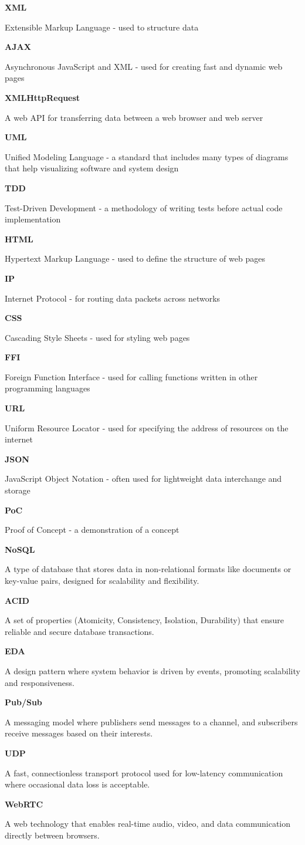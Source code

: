 \documentclass[]{final}
\begin{document}
\textbf{XML}

Extensible Markup Language - used to structure data

\textbf{AJAX}

Asynchronous JavaScript and XML - used for creating fast and dynamic web pages

\textbf{XMLHttpRequest}

A web API for transferring data between a web browser and web server

\textbf{UML}

Unified Modeling Language - a standard that includes many types of diagrams that help visualizing software and system design

\textbf{TDD}

Test-Driven Development - a methodology of writing tests before actual code implementation

\textbf{HTML}

Hypertext Markup Language - used to define the structure of web pages

\textbf{IP}

Internet Protocol - for routing data packets across networks

\textbf{CSS}

Cascading Style Sheets - used for styling web pages

\textbf{FFI}

Foreign Function Interface - used for calling functions written in other programming languages

\textbf{URL}

Uniform Resource Locator - used for specifying the address of resources on the internet

\textbf{JSON}

JavaScript Object Notation - often used for lightweight data interchange and storage

\textbf{PoC}

Proof of Concept - a demonstration of a concept

\textbf{NoSQL}

A type of database that stores data in non-relational formats like documents or key-value pairs, designed for scalability and flexibility.

\textbf{ACID}

A set of properties (Atomicity, Consistency, Isolation, Durability) that ensure reliable and secure database transactions.

\textbf{EDA}

A design pattern where system behavior is driven by events, promoting scalability and responsiveness.

\textbf{Pub/Sub}

A messaging model where publishers send messages to a channel, and subscribers receive messages based on their interests.

\textbf{UDP}

A fast, connectionless transport protocol used for low-latency communication where occasional data loss is acceptable.

\textbf{WebRTC}

A web technology that enables real-time audio, video, and data communication directly between browsers.
\end{document}
